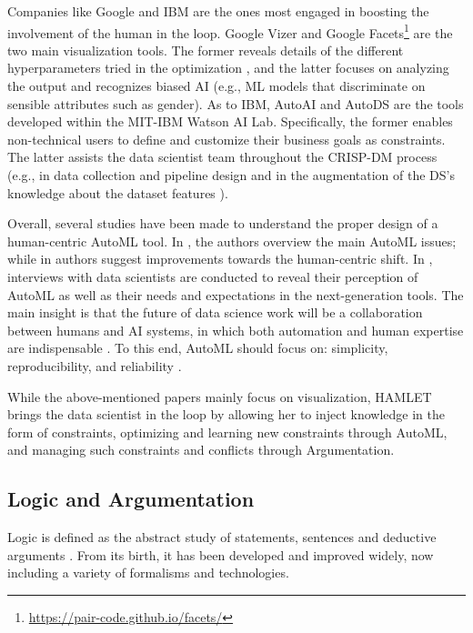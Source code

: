 Companies like Google and IBM are the ones most engaged in boosting the involvement of the human in the loop.
Google Vizer \cite{golovin2017google} and Google Facets\footnote{\url{https://pair-code.github.io/facets/}} are the two main visualization tools.
The former reveals details of the different hyperparameters tried in the optimization \cite{golovin2017google}, and the latter focuses on analyzing the output and recognizes biased AI (e.g., ML models that discriminate on sensible attributes such as gender).
As to IBM, AutoAI \cite{wang2020autoai} and AutoDS \cite{wang2021autods} are the tools developed within the MIT-IBM Watson AI Lab.
Specifically, the former enables non-technical users to define and customize their business goals as constraints. 
The latter assists the data scientist team throughout the CRISP-DM process (e.g., in data collection and pipeline design \cite{muller2019data, wang2021autods} and in the augmentation of the DS's knowledge about the dataset features \cite{drozdal2020trust}).

Overall, several studies have been made to understand the proper design of a human-centric AutoML tool.
In \cite{pfisterer2019towards}, the authors overview the main AutoML issues; while in \cite{khuat2022roles} authors suggest improvements towards the human-centric shift.
In \cite{gil2019towards, XinWLSP21automationml, crisan2021fits}, interviews with data scientists are conducted to reveal their perception of AutoML as well as their needs and expectations in the next-generation tools.
The main insight is that the future of data science work will be a collaboration between humans and AI systems, in which both automation and human expertise are indispensable \cite{wang2019human}.
To this end, AutoML should focus on: simplicity, reproducibility, and reliability \cite{XinWLSP21automationml, crisan2021fits}.

While the above-mentioned papers mainly focus on visualization, HAMLET brings the data scientist in the loop by allowing her to inject knowledge in the form of constraints, optimizing and learning new constraints through AutoML, and managing such constraints and conflicts through Argumentation.

\subsection{Logic and Argumentation}\label{logic}
Logic is defined as the abstract study of statements, sentences and deductive arguments \cite{Paulson2018logichistory}.
From its birth, it has been developed and improved widely, now including a variety of formalisms and technologies.

